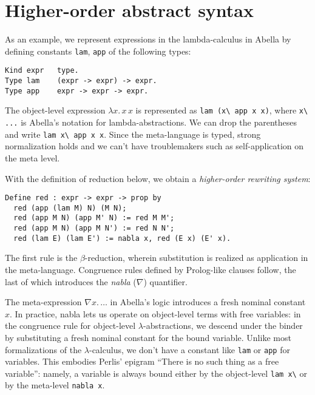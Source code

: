\documentclass[a4paper, 11pt,titlepage, openright, twoside]{report}
\newcommand{\+}{\enspace}
\begin{document}
\section{Higher-order abstract syntax}

As an example, we represent expressions in the lambda-calculus in Abella by defining constants \lstinline{lam}, \lstinline{app} of the following types:
\begin{lstlisting}
Kind expr   type.
Type lam    (expr -> expr) -> expr.
Type app    expr -> expr -> expr.
\end{lstlisting}
The object-level expression $λx.\,x\,x$ is represented as \lstinline{lam (x\ app x x)},
where \lstinline{x\ ...} is Abella's notation for lambda-abstractions.
We can drop the parentheses and write \lstinline{lam x\ app x x}.
Since the meta-language is typed, strong normalization holds and we can't have troublemakers such
as self-application on the meta level.

With the definition of reduction below, we obtain a \textit{higher-order rewriting system}:
\begin{lstlisting}
Define red : expr -> expr -> prop by
  red (app (lam M) N) (M N);
  red (app M N) (app M' N) := red M M';
  red (app M N) (app M N') := red N N';
  red (lam E) (lam E') := nabla x, red (E x) (E' x).
\end{lstlisting}
The first rule is the $β$-reduction, wherein substitution is realized as application in the meta-language.
Congruence rules defined by Prolog-like clauses follow,
the last of which introduces the \textit{nabla} ($\nabla$) quantifier.

The meta-expression $\nabla x.\,…$ in Abella's logic introduces a fresh nominal constant $x$.
In practice, nabla lets us operate on object-level terms with free variables:
in the congruence rule for object-level $λ$-abstractions,
we descend under the binder by substituting a fresh nominal constant for the bound variable.
Unlike most formalizations of the $λ$-calculus, we don't have a constant like \lstinline{lam} or \lstinline{app} for variables.
This embodies Perlis' epigram ``There is no such thing as a free variable'':
namely, a variable is always bound
either by the object-level \lstinline{lam x\}
or by the meta-level \lstinline{nabla x}.
\end{document}
